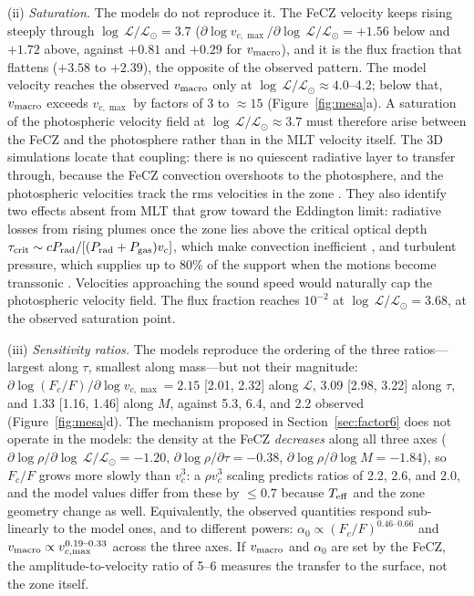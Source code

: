\documentclass[twocolumn]{aastex631}
\newcommand{\vmac}{v_{\rm macro}}
\newcommand{\teff}{T_{\rm eff}}
\renewcommand{\ell}{\mathcal{L}}
\newcommand{\lgL}{\log\,\ell/\ell_\odot}
\begin{document}
(ii) \emph{Saturation.} The models do not reproduce it. The FeCZ velocity keeps rising steeply through $\lgL=3.7$ ($\partial\log v_{c,\max}/\partial\lgL=+1.56$ below and $+1.72$ above, against $+0.81$ and $+0.29$ for $\vmac$), and it is the flux fraction that flattens ($+3.58$ to $+2.39$), the opposite of the observed pattern. The model velocity reaches the observed $\vmac$ only at $\lgL\approx4.0$--4.2; below that, $\vmac$ exceeds $v_{c,\max}$ by factors of 3 to $\approx15$ (Figure~\ref{fig:mesa}a). A saturation of the photospheric velocity field at $\lgL\approx3.7$ must therefore arise between the FeCZ and the photosphere rather than in the MLT velocity itself. The 3D simulations locate that coupling: there is no quiescent radiative layer to transfer through, because the FeCZ convection overshoots to the photosphere, and the photospheric velocities track the rms velocities in the zone \citep{schultz2023,ma2026}. They also identify two effects absent from MLT that grow toward the Eddington limit: radiative losses from rising plumes once the zone lies above the critical optical depth $\tau_{\rm crit}\sim cP_{\rm rad}/[(P_{\rm rad}+P_{\rm gas})v_c]$, which make convection inefficient \citep{jiang2015}, and turbulent pressure, which supplies up to 80\% of the support when the motions become transsonic \citep{schultz2023}. Velocities approaching the sound speed would naturally cap the photospheric velocity field. The flux fraction reaches $10^{-2}$ at $\lgL=3.68$, at the observed saturation point.

(iii) \emph{Sensitivity ratios.} The models reproduce the ordering of the three ratios---largest along $\tau$, smallest along mass---but not their magnitude: $\partial\log(F_c/F)/\partial\log v_{c,\max}=2.15$ [2.01, 2.32] along $\ell$, 3.09 [2.98, 3.22] along $\tau$, and 1.33 [1.16, 1.46] along $M$, against 5.3, 6.4, and 2.2 observed (Figure~\ref{fig:mesa}d). The mechanism proposed in Section~\ref{sec:factor6} does not operate in the models: the density at the FeCZ \emph{decreases} along all three axes ($\partial\log\rho/\partial\lgL=-1.20$, $\partial\log\rho/\partial\tau=-0.38$, $\partial\log\rho/\partial\log M=-1.84$), so $F_c/F$ grows more slowly than $v_c^3$: a $\rho v_c^3$ scaling predicts ratios of 2.2, 2.6, and 2.0, and the model values differ from these by $\le0.7$ because $\teff$ and the zone geometry change as well. Equivalently, the observed quantities respond sub-linearly to the model ones, and to different powers: $\alpha_0\propto(F_c/F)^{0.46\text{--}0.66}$ and $\vmac\propto v_{c,\max}^{0.19\text{--}0.33}$ across the three axes. If $\vmac$ and $\alpha_0$ are set by the FeCZ, the amplitude-to-velocity ratio of 5--6 measures the transfer to the surface, not the zone itself.
\end{document}
